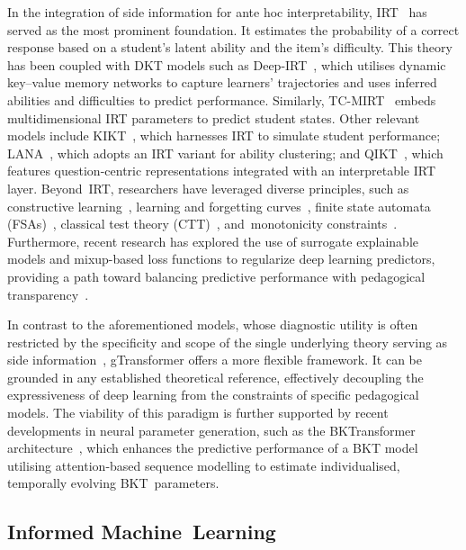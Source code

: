\documentclass[applsci,article,accept,moreauthors,pdftex]{Definitions/mdpi}
\begin{document}
In the integration of side information for ante hoc interpretability, IRT~\citep{embretson2013item} has served as the most prominent foundation. It estimates the probability of a correct response based on a student's latent ability and the item's difficulty. This theory has been coupled with DKT models such as Deep-IRT~\citep{yeung2019deep}, which {utilises} dynamic key--value memory networks to capture learners' trajectories and uses inferred abilities and difficulties to predict performance. Similarly, TC-MIRT~\citep{su2021time} embeds multidimensional IRT parameters to predict student states. Other relevant models include KIKT~\citep{gan2020knowledge}, which harnesses IRT to simulate student performance; LANA~\citep{zhou2021lana}, which adopts an IRT variant for ability clustering; and QIKT~\citep{chen2023improving}, which features question-centric representations integrated with an interpretable IRT layer. Beyond~IRT, researchers have leveraged diverse principles, such as constructive learning~\citep{liu2022ability, sun2024progressive}, learning and forgetting curves~\citep{zhang2021learning}, finite state automata (FSAs)~\citep{zhu2020learning}, classical test theory (CTT)~\citep{lee2024monacobert}, and~monotonicity constraints~\citep{zhang2023counterfactual}. {Furthermore, recent research has explored the use of surrogate explainable models and mixup-based loss functions to regularize deep learning predictors, providing a path toward balancing predictive performance with pedagogical transparency~\citep{labra2023exploring}.}

In contrast to the aforementioned models, whose diagnostic utility is often restricted by the specificity and scope of the single underlying theory serving as side information~\citep{bai2024survey}, gTransformer offers a more flexible framework. It can be grounded in any established theoretical reference, effectively decoupling the expressiveness of deep learning from the constraints of specific pedagogical models. {The viability of this paradigm is further supported by recent developments in neural parameter generation, such as the BKTransformer architecture~\citep{badrinath2025optimizing}, which enhances the predictive performance of a BKT model utilising attention-based sequence modelling to estimate individualised, temporally evolving BKT~parameters.}

\subsection{Informed Machine~Learning} \label{sec_iml}
\end{document}
